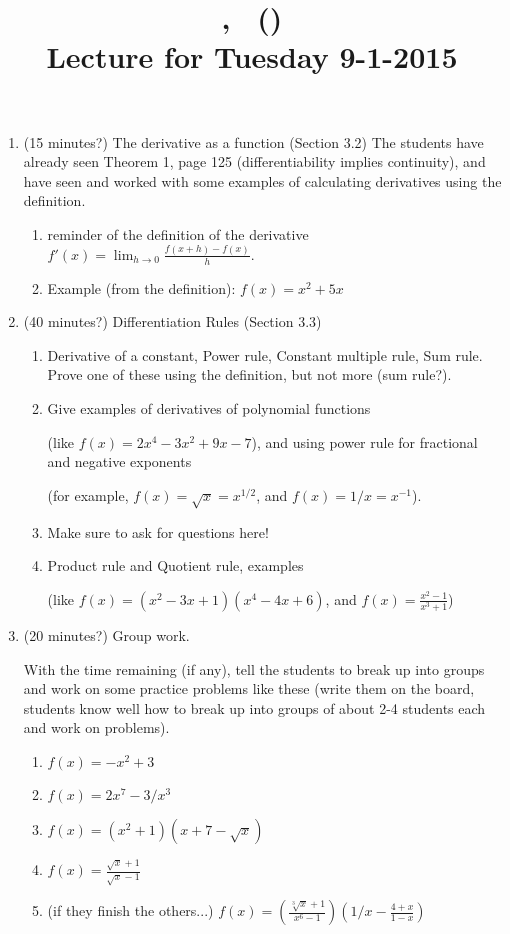 \documentclass[12pt]{amsart}
\title{\course, \semester\ (\instructor) \\ Lecture for Tuesday 9-1-2015}
\begin{document}
\maketitle

\begin{enumerate}[1. ]
\setlength{\itemsep}{1cm}
\item (15 minutes?)
The derivative as a function (Section 3.2)
{\color{blue}The students have already seen Theorem 1, page 125
(differentiability implies continuity), and have seen and worked with
some examples of calculating derivatives using the definition.}
\begin{enumerate}[ i. ]
\item
reminder of the definition of the derivative $\displaystyle f'(x) = \lim_{h
\to 0} \frac{f(x + h) - f(x)}{h}$.
\item
Example (from the definition): $\displaystyle f(x) = {x^2 + 5x}$
\end{enumerate}

\item (40 minutes?)
Differentiation Rules (Section 3.3)
\begin{enumerate}[ i. ]
\item
Derivative of a constant, Power rule, Constant multiple rule, Sum rule.
Prove one of these using the definition, but not more (sum rule?).
\item
Give examples of derivatives of polynomial functions 

(like $f(x) = 2x^4 -
3x^2 + 9x - 7$), and using power rule for fractional and negative exponents

(for example, $f(x) = \sqrt x = x^{1/2}$, and $f(x) = 1/x = x^{-1}$).
\item
Make sure to ask for questions here!
\item
Product rule and Quotient rule, examples 

(like $f(x) = (x^2 - 3x + 1)(x^4 -
4x + 6)$, and 
$\displaystyle f(x) = \frac{x^2 - 1}{x^3 + 1}$)
\end{enumerate}

\item (20 minutes?)
Group work.

With the time remaining (if any), tell the students to break up into groups
and work on some practice problems like these (write them on the board,
students know well how to break up into groups of about 2-4 students each
and work on problems).
\begin{enumerate}[ i. ]
\item
$f(x) = -x^2 + 3$
\item
$f(x) = 2x^7 - 3/x^3$
\item
$f(x) = (x^2 + 1)(x + 7 - \sqrt x)$
\item
$f(x) = \frac{\sqrt x + 1}{\sqrt x - 1}$
\item (if they finish the others...)
$\displaystyle f(x) = \left(\frac{\sqrt[3] x + 1}{x^6 - 1}\right)\left(1/x
- \frac{4 + x}{1 - x}\right)$
\end{enumerate}


\end{enumerate}
\end{document}
